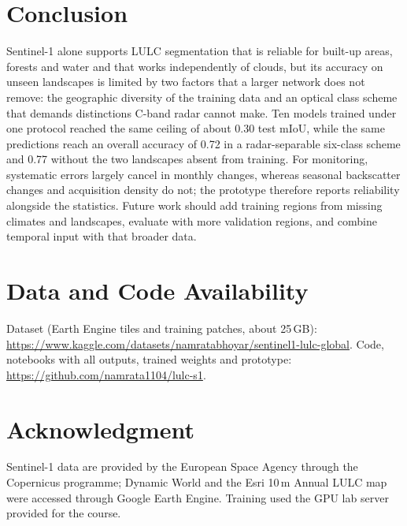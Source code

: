 \documentclass[12pt,conference]{IEEEtran}
\begin{document}
\section{Conclusion}

Sentinel-1 alone supports LULC segmentation that is reliable for built-up areas, forests and water and that works
independently of clouds, but its accuracy on unseen landscapes is limited by two factors that a larger network does
not remove: the geographic diversity of the training data and an optical class scheme that demands distinctions C-band
radar cannot make. Ten models trained under one protocol reached the same ceiling of about 0.30 test mIoU, while the
same predictions reach an overall accuracy of 0.72 in a radar-separable six-class scheme and 0.77 without the two
landscapes absent from training. For monitoring, systematic errors largely cancel in monthly changes, whereas seasonal
backscatter changes and acquisition density do not; the prototype therefore reports reliability alongside the
statistics. Future work should add training regions from missing climates and landscapes, evaluate with more
validation regions, and combine temporal input with that broader data.

\section*{Data and Code Availability}

Dataset (Earth Engine tiles and training patches, about 25\,GB):
\url{https://www.kaggle.com/datasets/namratabhoyar/sentinel1-lulc-global}.
Code, notebooks with all outputs, trained weights and prototype: \url{https://github.com/namrata1104/lulc-s1}.

\section*{Acknowledgment}

Sentinel-1 data are provided by the European Space Agency through the Copernicus programme; Dynamic World and the Esri
10\,m Annual LULC map were accessed through Google Earth Engine. Training used the GPU lab server provided for the course.
\end{document}
